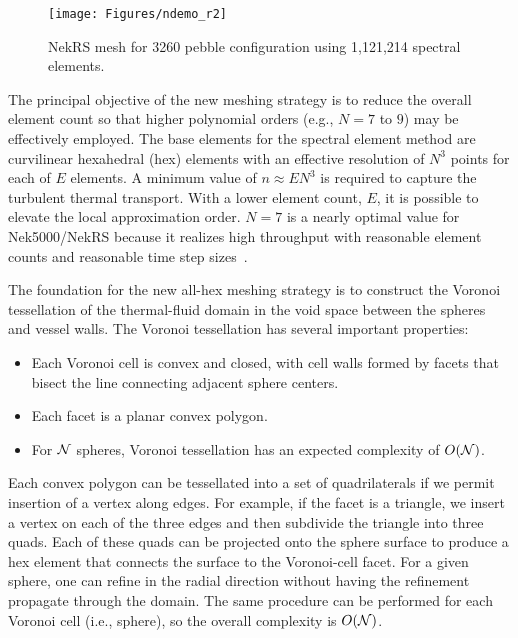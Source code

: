 \begin{figure}[htb!]
\centering
\texttt{[image: Figures/ndemo\_r2]}
\caption{NekRS mesh for 3260 pebble configuration using 1,121,214 spectral elements.}
\label{f:ndemo2}
\end{figure}

The principal objective of the new meshing strategy is to reduce the overall element count so that higher polynomial orders (e.g., $N=7$ to $9$) may be effectively employed.
The base elements for the spectral element method are curvilinear hexahedral (hex) elements with an effective resolution of $N^3$ points for each of $E$ elements.
A minimum value of $n \approx EN^3$ is required to capture the turbulent thermal transport.
With a lower element count, $E$, it is possible to elevate the local approximation order.
$N=7$ is a nearly optimal value for Nek5000/NekRS because it realizes high throughput with reasonable element counts and reasonable time step sizes~\cite{fischer20a}.

The foundation for the new all-hex meshing strategy is to construct the Voronoi tessellation of the thermal-fluid domain in the void space between the spheres and vessel walls.
The Voronoi tessellation has several important properties:
\begin{itemize}
  \item Each Voronoi cell is convex and closed, with cell walls formed by facets that bisect the line connecting adjacent sphere centers.
  \item Each facet is a planar convex polygon.
  \item For $\cal N$ spheres, Voronoi tessellation has an expected complexity of $O(\cal N)$.  
\end{itemize}
Each convex polygon can be tessellated into a set of quadrilaterals if we permit insertion of a vertex along edges.
For example, if the facet is a triangle, we insert a vertex on each of the three edges and then subdivide the triangle into three quads.
Each of these quads can be projected onto the sphere surface to produce a hex element that connects the surface to the Voronoi-cell facet.
For a given sphere, one can refine in the radial direction without having the refinement propagate through the domain.
The same procedure can be performed for each Voronoi cell (i.e., sphere), so the overall complexity is $O(\cal N)$.

